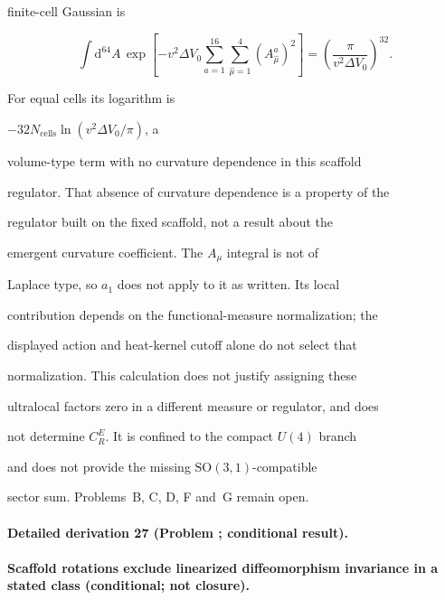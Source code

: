 finite-cell Gaussian is

\[

  \int\mathrm{d}^{64}A\,

       \exp\!\left[-v^2\Delta V_0

          \sum_{a=1}^{16}\sum_{\hat\mu=1}^{4}

                 (A_{\hat\mu}^{a})^2\right]

  =\left(\frac{\pi}{v^2\Delta V_0}\right)^{32}.

\]

For equal cells its logarithm is

\(-32N_{\mathrm{cells}}\ln(v^2\Delta V_0/\pi)\), a

volume-type term with no curvature dependence in this scaffold

regulator. That absence of curvature dependence is a property of the

regulator built on the fixed scaffold, not a result about the

emergent curvature coefficient. The \(A_\mu\) integral is not of

Laplace type, so \(a_1\) does not apply to it as written. Its local

contribution depends on the functional-measure normalization; the

displayed action and heat-kernel cutoff alone do not select that

normalization. This calculation does not justify assigning these

ultralocal factors zero in a different measure or regulator, and does

not determine \(C_R^E\). It is confined to the compact \(U(4)\) branch

and does not provide the missing \(\mathrm{SO}(3,1)\)-compatible

sector sum. Problems~B, C, D, F and~G remain open.



\paragraph{Detailed derivation 27 (Problem ; conditional result).} \label{ref:detail-26} %



\paragraph{Scaffold rotations exclude linearized diffeomorphism invariance in a stated class (conditional; not closure).}

